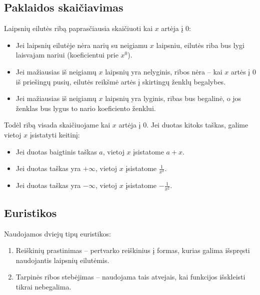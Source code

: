 \subsection{Paklaidos skaičiavimas}
	Laipsnių eilutės ribą paprasčiausia skaičiuoti kai $x$ artėja į 0:
	\begin{itemize}
		\item Jei laipsnių eilutėje nėra narių su neigiamu $x$ laipsniu, eilutės riba bus lygi laisvajam nariui
			(koeficientui prie $x^0$).
		\item Jei mažiausias iš neigiamų $x$ laipsnių yra nelyginis, ribos nėra -- kai $x$ artės į 0 iš priešingų pusių,
			eilutės reikšmė artės į skirtingų ženklų begalybes.
		\item Jei mažiausias iš neigiamų $x$ laipsnių yra lyginis, ribas bus begalinė, o jos ženklas bus lygus to nario
			koeficiento ženklui.
	\end{itemize}


	Todėl ribą visada skaičiuojame kai $x$ artėja į 0. Jei duotas kitoks taškas, galime vietoj $x$ įsistatyti keitinį:
	\begin{itemize}
		\item Jei duotas baigtinis taškas $a$, vietoj $x$ įsistatome $a + x$.
		\item Jei duotas taškas yra $+\infty$, vietoj $x$ įsistatome $\frac{1}{x^2}$.
		\item Jei duotas taškas yra $-\infty$, vietoj $x$ įsistatome $-\frac{1}{x^2}$.
	\end{itemize}



\subsection{Euristikos}
    Naudojamos dviejų tipų euristikos:
    \begin{enumerate}
        \item Reiškinių prastinimas -- pertvarko reiškinius į formas, kurias galima išspręsti naudojantis laipsnių eilutėmis.
        \item Tarpinės ribos stebėjimas -- naudojama tais atvejais, kai funkcijos išskleisti tikrai nebegalima.
    \end{enumerate}

